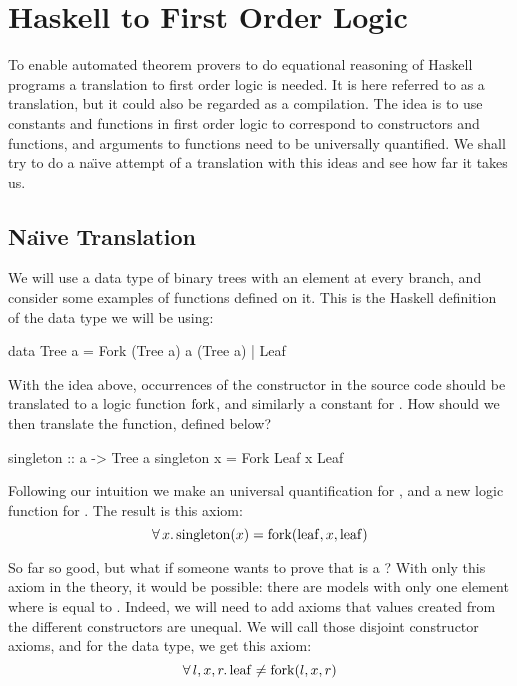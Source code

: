 \chapter{Haskell to First Order Logic}

To enable automated theorem provers to do equational reasoning of
Haskell programs a translation to first order logic is needed. It is
here referred to as a translation, but it could also be regarded as a
compilation. The idea is to use constants and functions in first order
logic to correspond to constructors and functions, and arguments to
functions need to be universally quantified. We shall try to do a
na\"{\i}ve attempt of a translation with this ideas and see how far it
takes us.

\section{Na\"{\i}ve Translation}

We will use a data type of binary trees with an element at every
branch, and consider some examples of functions defined on it. This
is the Haskell definition of the data type we will be using:

\begin{code}
data Tree a = Fork (Tree a) a (Tree a) | Leaf
\end{code}

\noindent
With the idea above, occurrences of the  constructor in the
source code should be translated to a logic function $\mathrm{fork}$, and
similarly a constant for . How should we then translate the
 function, defined below?

\begin{code}
singleton :: a -> Tree a
singleton x = Fork Leaf x Leaf
\end{code}

\noindent
Following our intuition we make an universal quantification for
, and a new logic function for . The result
is this axiom:
\begin{equation*}
\forall \, x . \, \mathrm{singleton}(x) = \mathrm{fork}(\mathrm{leaf},x,\mathrm{leaf})
\end{equation*}

\noindent
So far so good, but what if someone wants to prove that 
is a ? With only this axiom in the theory, it would be
possible: there are models with only one element where  is
equal to . Indeed, we will need to add axioms that values
created from the different constructors are unequal. We will call
those disjoint constructor axioms, and for the  data type, we
get this axiom:
\begin{equation*}
\forall \, l , x , r . \, \mathrm{leaf} \neq \mathrm{fork}(l,x,r)
\end{equation*}

